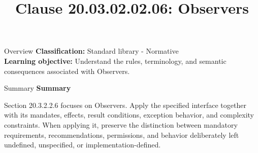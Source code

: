 \documentclass[10pt,letterpaper]{article}
\title{Clause 20.03.02.02.06: Observers}
\author{}
\date{}
\begin{document}
\maketitle
\begin{CornellOverviewBox}{Overview}
\textbf{Classification:} Standard library - Normative\\[2pt]
\textbf{Learning objective:} Understand the rules, terminology, and semantic consequences associated with Observers.
\end{CornellOverviewBox}\begin{CornellSummaryBox}{Summary}
{\sffamily\bfseries\color{Accent} Summary}\par\vspace{3pt}Section 20.3.2.2.6 focuses on Observers. Apply the specified interface together with its mandates, effects, result conditions, exception behavior, and complexity constraints. When applying it, preserve the distinction between mandatory requirements, recommendations, permissions, and behavior deliberately left undefined, unspecified, or implementation-defined.
\end{CornellSummaryBox}
\end{document}
